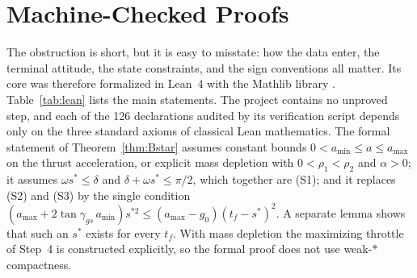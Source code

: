 \section{Machine-Checked Proofs}\label{sec:lean}
The obstruction is short, but it is easy to misstate: how the data enter, the terminal attitude, the state constraints, and
the sign conventions all matter. Its core was therefore formalized in Lean~4 with the Mathlib library
\cite{lean4,mathlib}. Table~\ref{tab:lean} lists the main statements. The project contains no unproved step, and each of
the 126 declarations audited by its verification script depends only on the three standard axioms of classical Lean
mathematics. The formal
statement of Theorem~\ref{thm:Bstar} assumes constant bounds $0<a_{\min}\le a\le a_{\max}$ on the thrust acceleration, or
explicit mass depletion with $0<\rho_1<\rho_2$ and $\alpha>0$; it assumes $\omega s^*\le\delta$ and
$\delta+\omega s^*\le\pi/2$, which together are (S1); and it replaces (S2) and (S3) by the single condition
$(a_{\max}+2\tan\gamma_{gs}\,a_{\min})s^{*2}\le(a_{\max}-g_0)(t_f-s^*)^2$. A separate lemma shows that such an $s^*$ exists
for every $t_f$. With mass depletion the maximizing throttle of Step~4 is constructed explicitly, so the formal proof does
not use weak-$*$ compactness.

